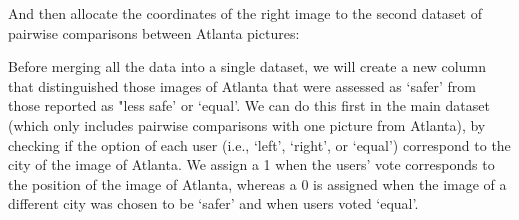 \documentclass[
]{article}
\newenvironment{Shaded}{\begin{snugshade}}{\end{snugshade}}
\newcommand{\NormalTok}[1]{#1}
\newcommand{\OperatorTok}[1]{\textcolor[rgb]{0.81,0.36,0.00}{\textbf{#1}}}
\newcommand{\StringTok}[1]{\textcolor[rgb]{0.31,0.60,0.02}{#1}}
\begin{document}
\begin{Shaded}
\end{Shaded}

And then allocate the coordinates of the right image to the second
dataset of pairwise comparisons between Atlanta pictures:

\begin{Shaded}
\end{Shaded}

Before merging all the data into a single dataset, we will create a new
column that distinguished those images of Atlanta that were assessed as
`safer' from those reported as "less safe' or `equal'. We can do this
first in the main dataset (which only includes pairwise comparisons with
one picture from Atlanta), by checking if the option of each user (i.e.,
`left', `right', or `equal') correspond to the city of the image of
Atlanta. We assign a 1 when the users' vote corresponds to the position
of the image of Atlanta, whereas a 0 is assigned when the image of a
different city was chosen to be `safer' and when users voted `equal'.
\end{document}
